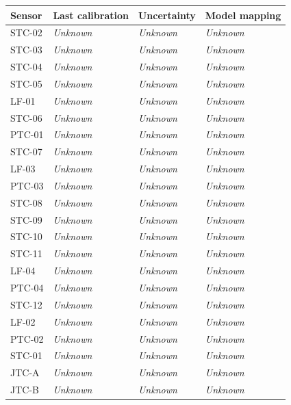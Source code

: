 \documentclass[11pt]{article}
\begin{document}
\begin{longtable}{>{\raggedright\arraybackslash}p{}>{\raggedright\arraybackslash}p{}>{\raggedright\arraybackslash}p{}>{\raggedright\arraybackslash}p{}}
\toprule
\textbf{Sensor} & \textbf{Last calibration} & \textbf{Uncertainty} & \textbf{Model mapping} \\\midrule\endhead
STC-02 & \textit{Unknown} & \textit{Unknown} & \textit{Unknown} \\[3pt]
STC-03 & \textit{Unknown} & \textit{Unknown} & \textit{Unknown} \\[3pt]
STC-04 & \textit{Unknown} & \textit{Unknown} & \textit{Unknown} \\[3pt]
STC-05 & \textit{Unknown} & \textit{Unknown} & \textit{Unknown} \\[3pt]
LF-01 & \textit{Unknown} & \textit{Unknown} & \textit{Unknown} \\[3pt]
STC-06 & \textit{Unknown} & \textit{Unknown} & \textit{Unknown} \\[3pt]
PTC-01 & \textit{Unknown} & \textit{Unknown} & \textit{Unknown} \\[3pt]
STC-07 & \textit{Unknown} & \textit{Unknown} & \textit{Unknown} \\[3pt]
LF-03 & \textit{Unknown} & \textit{Unknown} & \textit{Unknown} \\[3pt]
PTC-03 & \textit{Unknown} & \textit{Unknown} & \textit{Unknown} \\[3pt]
STC-08 & \textit{Unknown} & \textit{Unknown} & \textit{Unknown} \\[3pt]
STC-09 & \textit{Unknown} & \textit{Unknown} & \textit{Unknown} \\[3pt]
STC-10 & \textit{Unknown} & \textit{Unknown} & \textit{Unknown} \\[3pt]
STC-11 & \textit{Unknown} & \textit{Unknown} & \textit{Unknown} \\[3pt]
LF-04 & \textit{Unknown} & \textit{Unknown} & \textit{Unknown} \\[3pt]
PTC-04 & \textit{Unknown} & \textit{Unknown} & \textit{Unknown} \\[3pt]
STC-12 & \textit{Unknown} & \textit{Unknown} & \textit{Unknown} \\[3pt]
LF-02 & \textit{Unknown} & \textit{Unknown} & \textit{Unknown} \\[3pt]
PTC-02 & \textit{Unknown} & \textit{Unknown} & \textit{Unknown} \\[3pt]
STC-01 & \textit{Unknown} & \textit{Unknown} & \textit{Unknown} \\[3pt]
JTC-A & \textit{Unknown} & \textit{Unknown} & \textit{Unknown} \\[3pt]
JTC-B & \textit{Unknown} & \textit{Unknown} & \textit{Unknown} \\[3pt]
\bottomrule\end{longtable}\normalsize
\end{document}

